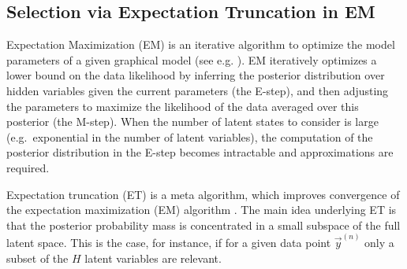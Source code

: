 \subsection{Selection via Expectation Truncation in EM}
Expectation Maximization (EM) is an iterative algorithm to optimize the model parameters of a given graphical model (see e.g. \citep{DempsterEtAl1977, NealHinton1998}).
EM iteratively optimizes a lower bound on the data likelihood by inferring the
posterior distribution over hidden variables given the current parameters (the
E-step), and then adjusting the parameters to maximize the likelihood of the
data averaged over this posterior (the M-step).
%
When the number of latent states to consider is large (e.g.\ exponential in the
number of latent variables), the computation of the posterior distribution in
the E-step becomes intractable and approximations are required.


%
Expectation truncation (ET) is a meta algorithm, which improves convergence of the expectation maximization (EM) algorithm \citep{LuckeEggert2010}.
%
The main idea underlying ET is that the posterior probability mass is concentrated in a small subspace of the full latent space.
This is the case, for instance, if for a given data point $\vec{y}^{(n)}$ 
only a subset of the $H$ latent variables  are relevant. 

